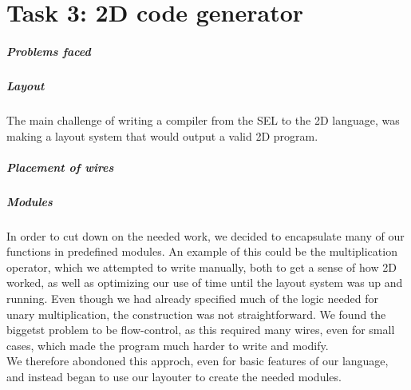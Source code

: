 \chapter*{Task 3: 2D code generator}
\label{compiler}

\paragraph{Problems faced}
\label{compiler:problems}

\paragraph{Layout}
\label{compiler:layout}
The main challenge of writing a compiler from the SEL to the 2D
language, was making a layout system that would output a valid 2D program. 

\paragraph{Placement of wires}
\label{compiler:placement}

\paragraph{Modules}
\label{compiler:modules}
In order to cut down on the needed work, we decided to encapsulate
many of our functions in predefined modules. An example of this could
be the multiplication operator, which we attempted to write manually,
both to get a sense of how 2D worked, as well as optimizing our use of
time until the layout system was up and running. Even though we had
already specified much of the logic needed for unary multiplication,
the construction was not straightforward. We found the biggetst
problem to be flow-control, as this required many wires, even for
small cases, which made the program much harder to write and modify.\\

We therefore abondoned this approch, even for basic features of our language, and instead began to use our layouter to create the needed modules.\\

